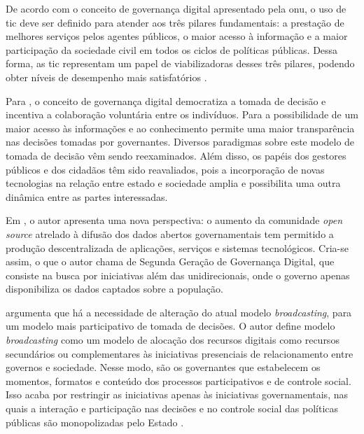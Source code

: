 \par
De acordo com o conceito de governança digital apresentado pela \acrshort{onu}, o uso de \acrshort{tic} deve ser definido para atender aos três pilares fundamentais: 
a prestação de melhores serviços pelos agentes públicos, o maior acesso à informação e a maior participação da sociedade civil em todos os ciclos de políticas públicas. 
Dessa forma, as \acrshort{tic} representam um papel de viabilizadoras desses três pilares, podendo obter níveis de desempenho mais satisfatórios \cite{onu2018}. 

\par
Para , o conceito de governança digital democratiza a tomada de decisão e incentiva a colaboração voluntária entre os indivíduos. Para  a possibilidade de um maior acesso às informações e ao conhecimento permite uma maior transparência nas decisões tomadas por governantes. Diversos paradigmas sobre este modelo de tomada de decisão vêm sendo reexaminados. 
Além disso, os papéis dos gestores públicos e dos cidadãos têm sido reavaliados, pois a incorporação 
de novas tecnologias na relação entre estado e sociedade amplia e possibilita uma outra dinâmica entre as partes interessadas. 

\par
Em , o autor apresenta uma nova perspectiva: o aumento da comunidade \textit{open source} atrelado à difusão dos dados abertos governamentais tem permitido a produção descentralizada de aplicações, serviços e sistemas tecnológicos. Cria-se assim, o que o autor chama de Segunda Geração de Governança Digital, 
que consiste na busca por iniciativas além das unidirecionais, onde o governo apenas disponibiliza os dados captados sobre a população.

\par

 argumenta que há a necessidade de alteração do atual modelo \textit{broadcasting}, para um modelo mais participativo de tomada de decisões. 
O autor define modelo \textit{broadcasting} como um modelo de alocação dos recursos digitais como recursos secundários ou complementares 
às iniciativas presenciais de relacionamento entre governos e sociedade. Nesse modo, são os governantes que estabelecem os momentos, formatos e conteúdo dos processos 
participativos e de controle social. Isso acaba por restringir as iniciativas apenas às iniciativas governamentais, nas quais a interação e participação nas decisões e no
controle social das políticas públicas são monopolizadas pelo Estado \cite{parra2017governancca}.

